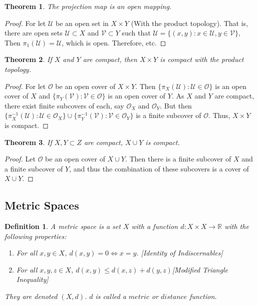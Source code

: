 \documentclass[oneside]{book}
\theoremstyle{mystyle}
\newtheorem{theorem}{Theorem}[section]
\newtheorem{definition}{Definition}[section]
\begin{document}
\begin{theorem}
The projection map is an open mapping.
\end{theorem}
\begin{proof}
For let $\mathscr{U}$ be an open set in $X\times Y$ (With the product topology). That is, there are open sets $\mathcal{U}\subset X$ and $\mathcal{V}\subset Y$ such that $\mathscr{U}= \{(x,y):x\in \mathcal{U},y\in \mathcal{V}\}$, Then $\pi_1(\mathscr{U}) =\mathcal{U}$, which is open. Therefore, etc.
\end{proof}

\begin{theorem}
If $X$ and $Y$ are compact, then $X\times Y$ is compact with the product topology.
\end{theorem}
\begin{proof}
For let $\mathscr{O}$ be an open cover of $X\times Y$. Then $\{\pi_X(\mathscr{U}):\mathscr{U}\in \mathscr{O}\}$ is an open cover of $X$ and $\{\pi_{Y}(\mathscr{V}):\mathscr{V}\in \mathscr{O}\}$ is an open cover of $Y$. As $X$ and $Y$ are compact, there exist finite subcovers of each, say $\mathcal{O}_X$ and $\mathcal{O}_Y$. But then $\{\pi_{X}^{-1}(\mathcal{U}):\mathcal{U}\in \mathcal{O}_X\}\cup \{\pi_{Y}^{-1}(\mathcal{V}):\mathcal{V}\in \mathcal{O}_Y\}$ is a finite subcover of $\mathscr{O}$. Thus, $X\times Y$ is compact.
\end{proof}

\begin{theorem}
If $X,Y\subset Z$ are compact, $X\cup Y$ is compact.
\end{theorem}
\begin{proof}
Let $\mathcal{O}$ be an open cover of $X\cup Y$. Then there is a finite subcover of $X$ and a finite subcover of $Y$, and thus the combination of these subcovers is a cover of $X\cup Y$.
\end{proof}
%
\subsection{Metric Spaces}
%
\begin{definition}
A metric space is a set $X$ with a function $d:X\times X\rightarrow \mathbb{R}$ with the following properties:
\begin{enumerate}
\item For all $x,y\in X$, $d(x,y) = 0\Leftrightarrow x=y$. \hfill [Identity of Indiscernables]
\item For all $x,y,z\in X$, $d(x,y) \leq d(x,z)+d(y,z)$\hfill [Modified Triangle Inequality]
\end{enumerate}
They are denoted $(X,d)$. $d$ is called a $metric$ or $distance$ function.
\end{definition}
\end{document}
